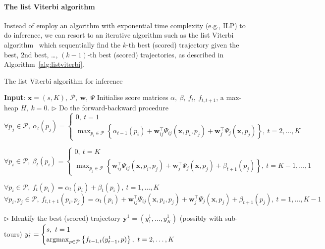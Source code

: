 \paragraph{The list Viterbi algorithm}
Instead of employ an algorithm with exponential time complexity (e.g., ILP) to do inference,
we can resort to an iterative algorithm such as the list Viterbi algorithm~\cite{nilsson2001sequentially,seshadri1994list}
which sequentially find the $k$-th best (scored) trajectory given the best, $2$nd best, \dots, $(k-1)$-th best (scored) trajectories,
as described in Algorithm~\ref{alg:listviterbi}.


\begin{algorithm}[htbp]
\caption{The list Viterbi algorithm for inference}
\label{alg:listviterbi}
\begin{algorithmic}[1]
\STATE \textbf{Input}: $\mathbf{x}=(s, K),~ \mathcal{P},~ \mathbf{w},~ \Psi$
\STATE Initialise score matrices $\alpha,~ \beta,~ f_t,~ f_{t, t+1}$, a max-heap $H,~ k=0$.
\STATE $\triangleright$ Do the forward-backward procedure~\cite{rabiner1989tutorial}
\STATE $\forall p_j \in \mathcal{P},~ \alpha_t(p_j) = 
        \begin{cases}
        0,~ t = 1 \\
        \max_{p_i \in \mathcal{P}} \left\{ \alpha_{t-1}(p_i) + \mathbf{w}_{ij}^\top \Psi_{ij}(\mathbf{x}, p_i, p_j) + 
        \mathbf{w}_j^\top \Psi_j(\mathbf{x}, p_j) \right\},~ t=2,\dots,K
        \end{cases}$

\STATE $\forall p_i \in \mathcal{P},~ \beta_t(p_i) = 
        \begin{cases}
        0,~ t = K \\
        \max_{p_j \in \mathcal{P}} \left\{ \mathbf{w}_{ij}^\top \Psi_{ij}(\mathbf{x}, p_i, p_j) + 
        \mathbf{w}_j^\top \Psi_j(\mathbf{x}, p_j) + \beta_{t+1}(p_j) \right\},~ t = K-1,\dots,1
        \end{cases}$

\STATE $\forall p_i \in \mathcal{P},~ f_t(p_i) = \alpha_t(p_i) + \beta_t(p_i),~ t = 1,\dots,K$
\STATE $\forall p_i, p_j \in \mathcal{P},~ f_{t,t+1}(p_i, p_j) = \alpha_t(p_i) + \mathbf{w}_{ij}^\top \Psi_{ij}(\mathbf{x}, p_i, p_j) + 
                              \mathbf{w}_j^\top \Psi_j(\mathbf{x}, p_j) + \beta_{t+1}(p_j),~ t = 1,\dots,K-1$

\STATE $\triangleright$ Identify the best (scored) trajectory $\mathbf{y}^1=(y_1^1,\dots,y_K^1)$ (possibly with sub-tours)
\STATE $y_t^1 = \begin{cases}
                s,~ t = 1 \\
                \operatorname*{argmax}_{p \in \mathcal{P}} \left\{ f_{t-1,t}(y_{t-1}^1, p) \right\},~ t = 2,\dots,K
                \end{cases}$


\end{algorithmic}
\end{algorithm}
